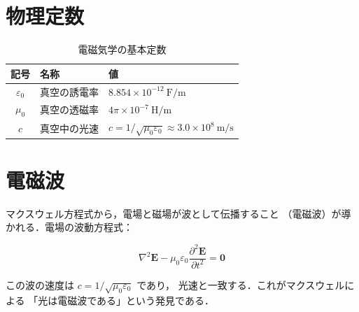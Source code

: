 \documentclass[lualatex, a4paper, 12pt]{jlreq}
\begin{document}
\section{物理定数}

\begin{table}[h]
  \centering
  \caption{電磁気学の基本定数}
  \begin{tabular}{cll}
    \hline
    記号 & 名称 & 値 \\
    \hline
    $\varepsilon_0$ & 真空の誘電率 &
      $8.854 \times 10^{-12}\ \mathrm{F/m}$ \\
    $\mu_0$ & 真空の透磁率 &
      $4\pi \times 10^{-7}\ \mathrm{H/m}$ \\
    $c$ & 真空中の光速 &
      $c = 1/\sqrt{\mu_0 \varepsilon_0}
       \approx 3.0 \times 10^8\ \mathrm{m/s}$ \\
    \hline
  \end{tabular}
  \label{tab:constants}
\end{table}

\section{電磁波}

マクスウェル方程式から，電場と磁場が波として伝播すること
（電磁波）が導かれる．電場の波動方程式：

\begin{equation}
  \nabla^2 \bm{E}
  - \mu_0 \varepsilon_0 \frac{\partial^2 \bm{E}}{\partial t^2}
  = \bm{0}
\end{equation}

この波の速度は $c = 1/\sqrt{\mu_0\varepsilon_0}$ であり，
光速と一致する．これがマクスウェルによる
「光は電磁波である」という発見である．
\end{document}

